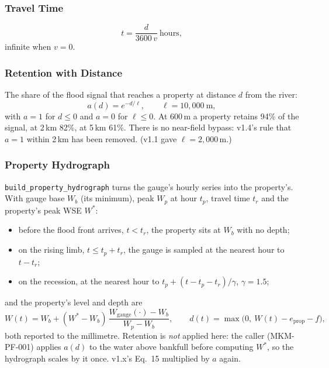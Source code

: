 \documentclass[11pt,a4paper]{article}
\begin{document}
\subsubsection{Travel Time}
\begin{equation}
    t = \frac{d}{3600\, v}\ \text{hours},
    \label{eq:travel}
\end{equation}
infinite when $v=0$.

\subsubsection{Retention with Distance}
The share of the flood signal that reaches a property at distance $d$ from the river:
\begin{equation}
    a(d) = e^{-d/\ell},\qquad \ell = 10{,}000\ \text{m},
    \label{eq:retention}
\end{equation}
with $a=1$ for $d\le0$ and $a=0$ for $\ell\le0$. At 600\,m a property retains 94\% of the
signal, at 2\,km 82\%, at 5\,km 61\%. There is no near-field bypass: v1.4's rule that
$a=1$ within 2\,km has been removed. (v1.1 gave $\ell=2{,}000$\,m.)

\subsubsection{Property Hydrograph}
\texttt{build\_property\_hydrograph} turns the gauge's hourly series into the property's.
With gauge base $W_b$ (its minimum), peak $W_p$ at hour $t_p$, travel time $t_r$ and the
property's peak WSE $W^{*}$:
\begin{itemize}[nosep]
\item before the flood front arrives, $t<t_r$, the property sits at $W_b$ with no depth;
\item on the rising limb, $t\le t_p+t_r$, the gauge is sampled at the nearest hour to
      $t-t_r$;
\item on the recession, at the nearest hour to $t_p+(t-t_p-t_r)/\gamma$, $\gamma=1.5$;
\end{itemize}
and the property's level and depth are
\begin{equation}
    W(t) = W_b + (W^{*} - W_b)\, \frac{W_{\mathrm{gauge}}(\cdot) - W_b}{W_p - W_b},\qquad
    d(t) = \max\bigl(0,\ W(t) - e_{\mathrm{prop}} - f\bigr),
    \label{eq:hydrograph}
\end{equation}
both reported to the millimetre. Retention is \emph{not} applied here: the caller
(MKM-PF-001) applies $a(d)$ to the water above bankfull before computing $W^{*}$, so the
hydrograph scales by it once. v1.x's Eq.~15 multiplied by $a$ again.
\end{document}
